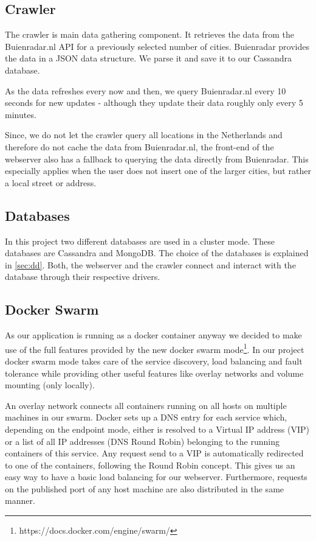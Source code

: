 \documentclass[a4paper]{article}
\begin{document}
\subsection{Crawler}
The crawler is main data gathering component. It retrieves the data from the Buienradar.nl API for a previously selected number of cities. Buienradar provides the data in a JSON data structure. We parse it and save it to our Cassandra database.

As the data refreshes every now and then, we query Buienradar.nl every 10 seconds for new updates - although they update their data roughly only every 5 minutes.

Since, we do not let the crawler query all locations in the Netherlands and therefore do not cache the data from Buienradar.nl, the front-end of the webserver also has a fallback to querying the data directly from Buienradar. This especially applies when the user does not insert one of the larger cities, but rather a local street or address.

\subsection{Databases}
In this project two different databases are used in a cluster mode. These databases are Cassandra and MongoDB. The choice of the databases is explained in \ref{sec:dd}. Both, the webserver and the crawler connect and interact with the database through their respective drivers.

\subsection{Docker Swarm}
As our application is running as a docker container anyway we decided to make use of the full features provided by the new docker swarm mode\footnote{https://docs.docker.com/engine/swarm/}. In our project docker swarm mode takes care of the service discovery, load balancing and fault tolerance while providing other useful features like overlay networks and volume mounting (only locally).

An overlay network connects all containers running on all hosts on multiple machines in our swarm. Docker sets up a DNS entry for each service which, depending on the endpoint mode, either is resolved to a Virtual IP address (VIP) or a list of all IP addresses (DNS Round Robin) belonging to the running containers of this service. Any request send to a VIP is automatically redirected to one of the containers, following the Round Robin concept. This gives us an easy way to have a basic load balancing for our webserver. Furthermore, requests on the published port of any host machine are also distributed in the same manner.
\end{document}
